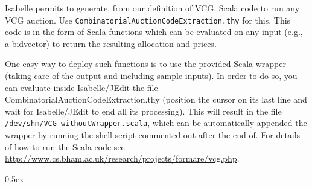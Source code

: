 \documentclass[11pt,a4paper]{article}
\begin{document}
Isabelle permits to generate, from our definition of VCG, Scala code
to run any VCG auction.  Use
\texttt{CombinatorialAuctionCodeExtraction.thy} for this. This code is
in the form of Scala functions which can be evaluated on any input
(e.g., a bidvector) to return the resulting allocation and prices.

One easy way to deploy such functions is to use the provided Scala
wrapper (taking care of the output and including sample inputs).  In
order to do so, you can evaluate inside Isabelle/JEdit the file
CombinatorialAuctionCodeExtraction.thy (position the cursor on its
last line and wait for Isabelle/JEdit to end all its processing).
This will result in the file
\texttt{/dev/shm/VCG-withoutWrapper.scala}, which can be automatically
appended the wrapper by running the shell script commented out after
the end of. For details of how to run the Scala code see
\url{http://www.cs.bham.ac.uk/research/projects/formare/vcg.php}.


\parindent 0pt\parskip 0.5ex





\end{document}
